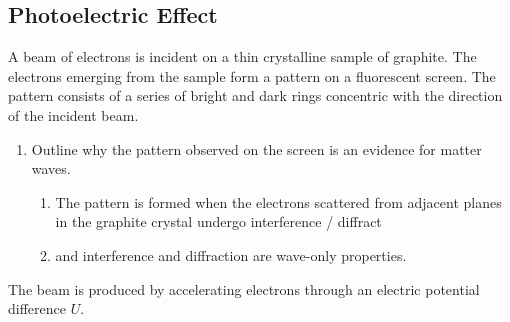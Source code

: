 \documentclass[a4paper,12pt]{article}
\begin{document}
\pagebreak

\subsection{Photoelectric Effect}

A beam of electrons is incident on a thin crystalline sample of graphite. The electrons emerging from the sample form a pattern on a fluorescent screen. The pattern consists of a series of bright and dark rings concentric with the direction of the incident beam.

\begin{enumerate}[label=(\alph*)]
  \item Outline why the pattern observed on the screen is an evidence for matter waves.
        \begin{enumerate}
          \item The pattern is formed when the electrons scattered from adjacent planes in the graphite crystal undergo interference / diffract
          \item and interference and diffraction are wave-only properties.
        \end{enumerate}

\end{enumerate}

The beam is produced by accelerating electrons through an electric potential difference $U$.
\end{document}
